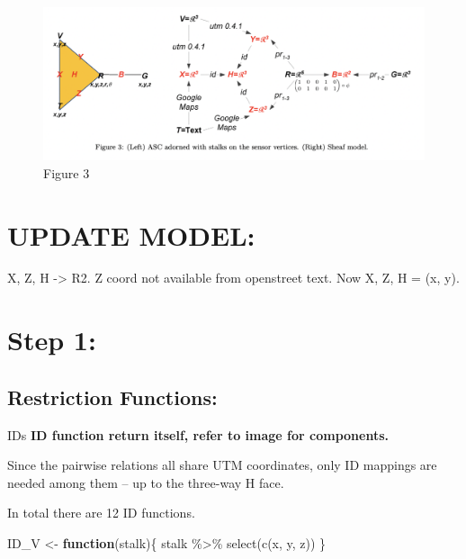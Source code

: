 \documentclass[
]{article}
\newenvironment{Shaded}{\begin{snugshade}}{\end{snugshade}}
\newcommand{\ControlFlowTok}[1]{\textcolor[rgb]{0.13,0.29,0.53}{\textbf{#1}}}
\newcommand{\FunctionTok}[1]{\textcolor[rgb]{0.00,0.00,0.00}{#1}}
\newcommand{\NormalTok}[1]{#1}
\newcommand{\OtherTok}[1]{\textcolor[rgb]{0.56,0.35,0.01}{#1}}
\newcommand{\SpecialCharTok}[1]{\textcolor[rgb]{0.00,0.00,0.00}{#1}}
\begin{document}
\begin{figure}
\centering
\includegraphics{GeoFigure3.png}
\caption{Figure 3}
\end{figure}

\hypertarget{update-model}{%
\section{UPDATE MODEL:}\label{update-model}}

X, Z, H -\textgreater{} R2. Z coord not available from openstreet text.
Now X, Z, H = (x, y).

\hypertarget{section}{%
\section{\texorpdfstring{\textbf{Step 1:}}{}}\label{section}}

\hypertarget{restriction-functions}{%
\subsection{Restriction Functions:}\label{restriction-functions}}

IDs \textbf{ID function return itself, refer to image for components.}

Since the pairwise relations all share UTM coordinates, only ID mappings
are needed among them -- up to the three-way H face.

In total there are 12 ID functions.

\begin{Shaded}
\begin{Highlighting}[]
\NormalTok{ID\_V }\OtherTok{\textless{}{-}} \ControlFlowTok{function}\NormalTok{(stalk)\{}
\NormalTok{  stalk }\SpecialCharTok{\%\textgreater{}\%}
    \FunctionTok{select}\NormalTok{(}\FunctionTok{c}\NormalTok{(x, y, z))}
\NormalTok{\}}
\end{Highlighting}
\end{Shaded}
\end{document}

